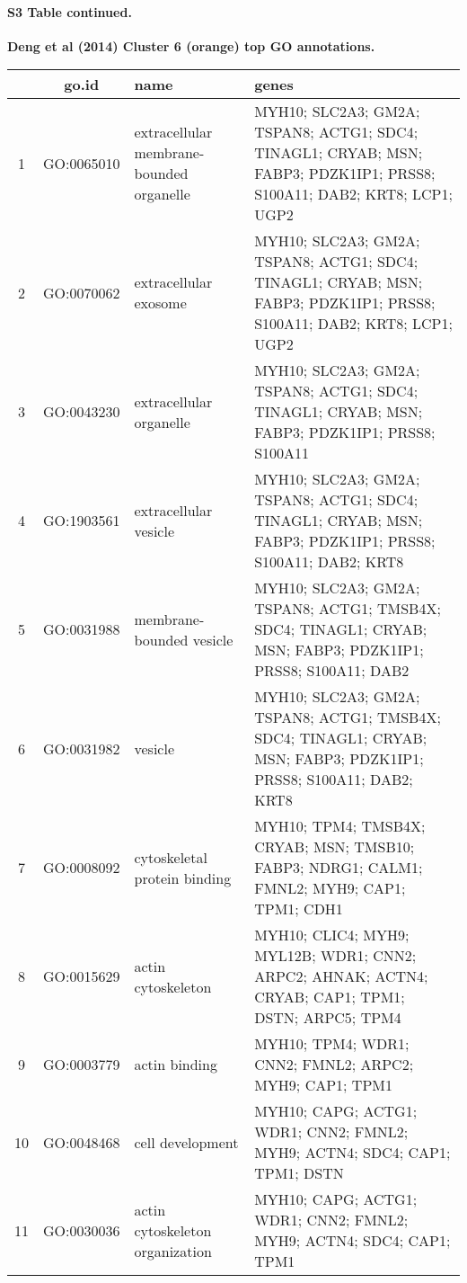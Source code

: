 \documentclass[10pt,letterpaper]{article}
\begin{document}
\paragraph*{S3 Table continued.}
{\bf Deng et al (2014) Cluster 6 (orange) top GO annotations.}
\begin{table}[!hp]
\begin{adjustwidth}{-.5in}{0in}
\begin{tabular}{|c|c|p{1.5in}|p{4in}|}
  \hline
& go.id & name & genes \\
  \hline
1 & GO:0065010 & extracellular membrane-bounded organelle  & \footnotesize{MYH10; SLC2A3; GM2A; TSPAN8; ACTG1; SDC4; TINAGL1; CRYAB; MSN; FABP3; PDZK1IP1; PRSS8; S100A11; DAB2; KRT8; LCP1; UGP2}   \\
2 & GO:0070062 & extracellular exosome &  \footnotesize{MYH10; SLC2A3; GM2A; TSPAN8; ACTG1; SDC4; TINAGL1; CRYAB; MSN; FABP3; PDZK1IP1; PRSS8; S100A11; DAB2; KRT8; LCP1; UGP2}\\
3 & GO:0043230 & extracellular organelle & \footnotesize{MYH10; SLC2A3; GM2A; TSPAN8; ACTG1; SDC4; TINAGL1; CRYAB; MSN; FABP3; PDZK1IP1; PRSS8; S100A11} \\
4 & GO:1903561 & extracellular vesicle & \footnotesize{MYH10; SLC2A3; GM2A; TSPAN8; ACTG1; SDC4; TINAGL1; CRYAB; MSN; FABP3; PDZK1IP1; PRSS8; S100A11; DAB2; KRT8}  \\
5 & GO:0031988 & membrane-bounded vesicle & \footnotesize{MYH10; SLC2A3; GM2A; TSPAN8; ACTG1; TMSB4X; SDC4; TINAGL1; CRYAB; MSN; FABP3; PDZK1IP1; PRSS8; S100A11; DAB2}  \\
6 & GO:0031982 & vesicle & \footnotesize{MYH10; SLC2A3; GM2A; TSPAN8; ACTG1; TMSB4X; SDC4; TINAGL1; CRYAB; MSN; FABP3; PDZK1IP1; PRSS8; S100A11; DAB2; KRT8} \\
7 & GO:0008092 & cytoskeletal protein binding & \footnotesize{MYH10; TPM4; TMSB4X; CRYAB; MSN; TMSB10; FABP3; NDRG1; CALM1; FMNL2; MYH9; CAP1; TPM1; CDH1} \\
8 & GO:0015629 & actin cytoskeleton & \footnotesize{MYH10; CLIC4; MYH9; MYL12B; WDR1; CNN2; ARPC2; AHNAK; ACTN4; CRYAB; CAP1; TPM1; DSTN; ARPC5; TPM4} \\
9 & GO:0003779 & actin binding & \footnotesize{MYH10; TPM4; WDR1; CNN2; FMNL2; ARPC2; MYH9; CAP1; TPM1}  \\
10 & GO:0048468 & cell development & \footnotesize{MYH10; CAPG; ACTG1; WDR1; CNN2; FMNL2; MYH9; ACTN4; SDC4; CAP1; TPM1; DSTN} \\
11 & GO:0030036 & actin cytoskeleton organization & \footnotesize{MYH10; CAPG; ACTG1; WDR1; CNN2; FMNL2; MYH9; ACTN4; SDC4; CAP1; TPM1} \\

\end{tabular}
\end{adjustwidth}
\end{table}
\end{document}
